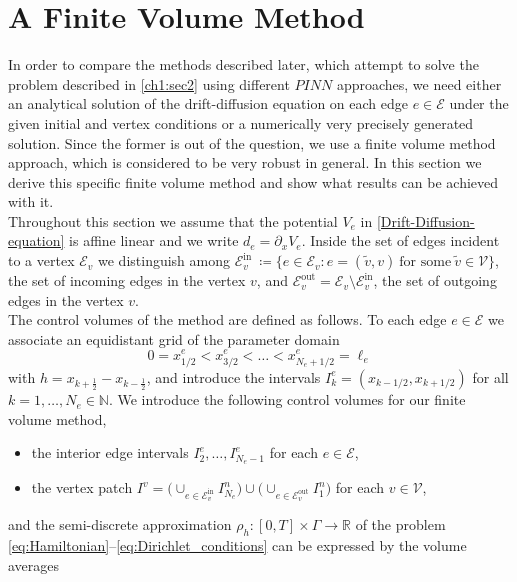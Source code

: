 \chapter{A Finite Volume Method}
\label{ch2}

In order to compare the methods described later, which attempt to solve the problem described in \cref{ch1:sec2} using different $PINN$ approaches, we need either an analytical solution of the drift-diffusion equation on each edge $e \in \mathcal{E}$ under the given initial and vertex conditions or a numerically very precisely generated solution. Since the former is out of the question, we use a finite volume method approach, which is considered to be very robust in general. In this section we derive this specific finite volume method and show what results can be achieved with it.  \\
Throughout this section we assume that the potential $V_e$ in \cref{Drift-Diffusion-equation} is affine linear and we write $d_e = \partial_x V_e$. Inside the set of edges incident to a vertex $\mathcal{E}_v$ we distinguish among $\mathcal{E}_v^{\text{in}} \ \coloneqq \{ e \in \mathcal{E}_v \colon e = ( \widetilde{v}, v ) \ \text{for some} \ \widetilde{v} \in \mathcal{V} \}$, the set of incoming edges in the vertex $v$, and $\mathcal{E}_v^{\text{out}} = \mathcal{E}_v \setminus \mathcal{E}_v^{\text{in}}$, the set of outgoing edges in the vertex $v$. \\
The control volumes of the method are defined as follows. To each edge $e \in \mathcal{E}$ we associate an equidistant grid of the parameter domain
\begin{equation*}
	0 = x^e_{1/2} < x^e_{3/2} <\ldots < x^e_{N_e+1/2} = \ell_e
\end{equation*}
with $h = x_{k+\frac{1}{2}} - x_{k-\frac{1}{2}}$, and introduce the intervals $I_k^e = (x_{k-1/2}, x_{k+1/2})$ for all $k=1, \ldots, N_e \in \mathbb{N}$. We introduce the following control volumes for our finite volume method,
\begin{itemize}
	\item the interior edge intervals $I_2^e, \ldots, I_{N_e-1}^e$ for
	each $e \in \mathcal{E}$,
	\item the vertex patch $I^v = \big(\cup_{e\in \mathcal{E}_v^{\text{in}}} I_{N_e}^n\big) \cup \big(\cup_{e\in \mathcal{E}_v^{\text{out}}} I_1^n\big)$ for
	each $v \in \mathcal{V}$,
\end{itemize}
and the semi-discrete approximation $\rho_h \colon [0,T] \times \Gamma \to \mathbb{R}$ of the problem \eqref{eq:Hamiltonian}--\eqref{eq:Dirichlet_conditions} can be expressed by the volume averages 
